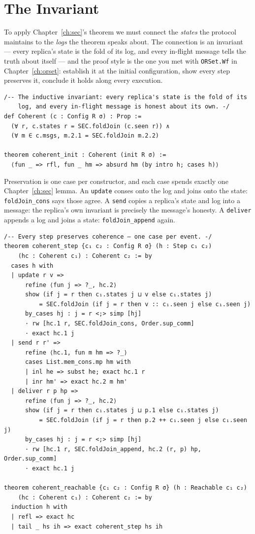 \documentclass[12pt, a4paper, openright]{book}
\theoremstyle{thmstyle}
\theoremstyle{defstyle}
\newcommand{\lc}[1]{\texttt{#1}}
\begin{document}
\section{The Invariant}

To apply Chapter~\ref{ch:sec}'s theorem we must connect the
\emph{states} the protocol maintains to the \emph{logs} the theorem
speaks about. The connection is an invariant --- every replica's state is
the fold of its log, and every in-flight message tells the truth about
itself --- and the proof style is the one you met with \lc{ORSet.Wf} in
Chapter~\ref{ch:orset}: establish it at the initial configuration, show
every step preserves it, conclude it holds along every execution.

\begin{verbatim}
/-- The inductive invariant: every replica's state is the fold of its
    log, and every in-flight message is honest about its own. -/
def Coherent (c : Config R σ) : Prop :=
  (∀ r, c.states r = SEC.foldJoin (c.seen r)) ∧
  (∀ m ∈ c.msgs, m.2.1 = SEC.foldJoin m.2.2)

theorem coherent_init : Coherent (init R σ) :=
  ⟨fun _ => rfl, fun _ hm => absurd hm (by intro h; cases h)⟩
\end{verbatim}

Preservation is one case per constructor, and each case spends exactly
one Chapter~\ref{ch:sec} lemma. An \lc{update} conses onto the log and
joins onto the state: \lc{foldJoin_cons} says those agree. A \lc{send}
copies a replica's state and log into a message: the replica's own
invariant is precisely the message's honesty. A \lc{deliver} appends a
log and joins a state: \lc{foldJoin_append} again.

\begin{verbatim}
/-- Every step preserves coherence — one case per event. -/
theorem coherent_step {c₁ c₂ : Config R σ} (h : Step c₁ c₂)
    (hc : Coherent c₁) : Coherent c₂ := by
  cases h with
  | update r v =>
      refine ⟨fun j => ?_, hc.2⟩
      show (if j = r then c₁.states j ⊔ v else c₁.states j)
          = SEC.foldJoin (if j = r then v :: c₁.seen j else c₁.seen j)
      by_cases hj : j = r <;> simp [hj]
      · rw [hc.1 r, SEC.foldJoin_cons, Order.sup_comm]
      · exact hc.1 j
  | send r r' =>
      refine ⟨hc.1, fun m hm => ?_⟩
      cases List.mem_cons.mp hm with
      | inl he => subst he; exact hc.1 r
      | inr hm' => exact hc.2 m hm'
  | deliver r p hp =>
      refine ⟨fun j => ?_, hc.2⟩
      show (if j = r then c₁.states j ⊔ p.1 else c₁.states j)
          = SEC.foldJoin (if j = r then p.2 ++ c₁.seen j else c₁.seen j)
      by_cases hj : j = r <;> simp [hj]
      · rw [hc.1 r, SEC.foldJoin_append, hc.2 (r, p) hp, Order.sup_comm]
      · exact hc.1 j

theorem coherent_reachable {c₁ c₂ : Config R σ} (h : Reachable c₁ c₂)
    (hc : Coherent c₁) : Coherent c₂ := by
  induction h with
  | refl => exact hc
  | tail _ hs ih => exact coherent_step hs ih
\end{verbatim}
\end{document}
